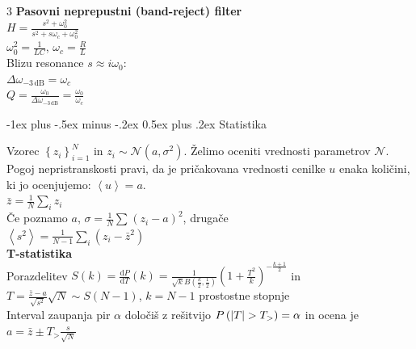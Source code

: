 \documentclass[10pt,landscape]{article}
\makeatletter
\renewcommand{\section}{\@startsection{section}{1}{0mm}%
	{-1ex plus -.5ex minus -.2ex}%
	{0.5ex plus .2ex}%
	{\normalfont\large\bfseries}}
\theoremstyle{definition}
\makeatother
\begin{document}
\begin{multicols}{3}
  \textbf{Pasovni neprepustni (band-reject) filter} \\
  $H = \frac{s^2 + \omega_0^2}{s^2 + s\omega_c + \omega_0^2}$ \\
  $\omega_0^2 = \frac{1}{LC}$, \qquad $\omega_c = \frac{R}{L}$ \\
  Blizu resonance $s \approx i \omega_0$: \\
  $\Delta \omega_{-3 \, \text{dB}} = \omega_c$ \\
  $Q = \frac{\omega_0}{\Delta \omega_{-3 \, \text{dB}}} = \frac{\omega_0}{\omega_c}$ \\
  \vspace{-17pt}
  \begin{center}
    \begin{circuitikz}
    \end{circuitikz} 
  \end{center}\vspace{-45pt}

  \section{Statistika}

  Vzorec \( \left\{ z_i \right\}_{i = 1}^N \) in \( z_i \sim \mathcal{N} (a, \sigma ^2 ) \). Želimo oceniti vrednosti parametrov \( \mathcal{N} \). Pogoj nepristranskosti pravi, da je pričakovana vrednosti cenilke \( u \) enaka količini, ki jo ocenjujemo: \( \left\langle u \right\rangle = a\). \\

  \( \bar{z} = \frac{1}{N} \sum\limits_i^{} z_i \) \\

  Če poznamo \( a \),  \( \sigma = \frac{1}{N} \sum\limits_{}^{} \left( z_i - a \right) ^2 \), drugače \\

  \( \left\langle s ^2 \right\rangle = \frac{1}{N - 1} \sum\limits_i^{} \left( z_i - \bar{z} ^2 \right)\)\\
  \textbf{T-statistika} \\
  Porazdelitev \( S(k) = \frac{\mathrm{d} P}{\mathrm{d} T} (k) = \frac{1}{\sqrt{k} B \left( \frac{k}{2}, \frac{1}{2} \right)} \left( 1 + \frac{T ^2}{k} \right)^{- \frac{k + 1}{2}} \) in \\
  \( T = \frac{\bar{z} - a}{\sqrt{s ^2}} \sqrt{N} \sim S (N - 1) \), \( k = N - 1 \) prostostne stopnje \\
  Interval zaupanja pir \( \alpha \) določiš z rešitvijo \( P \left( \left| T \right| > T_{>} \right) = \bf{\alpha} \) in ocena je \\
  \( a = \bar{z} \pm T_{>} \frac{s}{\sqrt{N}} \)


\end{multicols}
\end{document}

